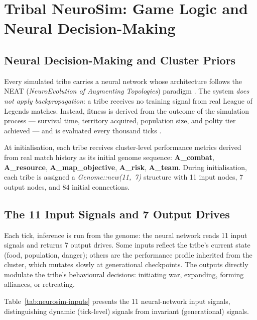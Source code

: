 \chapter{Tribal NeuroSim: Game Logic and Neural Decision-Making}

\section{Neural Decision-Making and Cluster Priors}

Every simulated tribe carries a neural network whose architecture follows the NEAT (\textit{NeuroEvolution of Augmenting Topologies}) paradigm \cite{stanleymiikkulainen2002}. The system \textit{does not apply backpropagation}: a tribe receives no training signal from real League of Legends matches. Instead, fitness is derived from the outcome of the simulation process --- survival time, territory acquired, population size, and polity tier achieved --- and is evaluated every thousand ticks \cite{holland1992}.

At initialisation, each tribe receives cluster-level performance metrics derived from real match history as its initial genome sequence: \textbf{A\_combat}, \textbf{A\_resource}, \textbf{A\_map\_objective}, \textbf{A\_risk}, \textbf{A\_team}. During initialisation, each tribe is assigned a \textit{Genome::new(11,~7)} structure with 11 input nodes, 7 output nodes, and 84 initial connections.

\section{The 11 Input Signals and 7 Output Drives}

Each tick, inference is run from the genome: the neural network reads 11 input signals and returns 7 output drives. Some inputs reflect the tribe's current state (food, population, danger); others are the performance profile inherited from the cluster, which mutates slowly at generational checkpoints. The outputs directly modulate the tribe's behavioural decisions: initiating war, expanding, forming alliances, or retreating.

Table~\ref{tab:neurosim-inputs} presents the 11 neural-network input signals, distinguishing dynamic (tick-level) signals from invariant (generational) signals.

